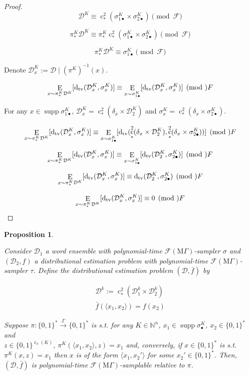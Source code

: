 \documentclass[11pt]{article}
\numberwithin{equation}{section}
\theoremstyle{definition}
\theoremstyle{plain}
\newtheorem{proposition}{Proposition}[section]
\newcommand{\Bool}{\{0,1\}}
\newcommand{\Words}{{\Bool^*}}
\DeclareMathOperator{\Supp}{supp}
\DeclareMathOperator{\E}{E}
\DeclareMathOperator{\R}{r}
\DeclareMathOperator{\En}{c}
\newcommand{\Dtv}{\operatorname{d}_{\textnormal{tv}}}
\newcommand{\Nats}{\mathbb{N}}
\newcommand{\Chev}[1]{\langle #1 \rangle}
\newcommand{\Dist}{\mathcal{D}}
\newcommand{\MGrow}{\mathrm{M}\Gamma}
\newcommand{\Fall}{\mathcal{F}}
\newcommand{\EMG}{\Fall(\MGrow)}
\newcommand{\Scheme}{\xrightarrow{\Gamma}}
\begin{document}
\begin{proof}

\[\Dist^{K} \equiv \En_*^2(\sigma_{1\bullet}^K \times \sigma_{2\bullet}^K)\pmod \Fall\]

\[\pi_*^K\Dist^{K} \equiv \pi_*^K\En_*^2(\sigma_{1\bullet}^K \times \sigma_{2\bullet}^K) \pmod \Fall\] 

\[\pi_*^K\Dist^{K} \equiv  \sigma_{1\bullet}^K \pmod \Fall\]

Denote $\Dist_x^K:=\Dist \mid (\pi^K)^{-1}(x)$.

\[\E_{x \sim \pi_*^K\Dist^{K}}[\Dtv(\Dist_x^K,\sigma_x^K)] \equiv \E_{x \sim \sigma_{1\bullet}^K}[\Dtv(\Dist_x^K,\sigma_x^K)] \pmod \Fall\]

For any $x \in \Supp \sigma_{1\bullet}^{K}$, $\Dist_x^K = \En_*^2(\delta_x \times \Dist_2^{K})$ and $\sigma_x^K=\En_*^2(\delta_x \times \sigma_{2\bullet}^K)$.

\[\E_{x \sim \pi_*^K\Dist^{K}}[\Dtv(\Dist_x^K,\sigma_x^K)] \equiv \E_{x \sim \sigma_{1\bullet}^K}[\Dtv(\En_*^2(\delta_x \times \Dist_2^{K}),\En_*^2(\delta_x \times \sigma_{2\bullet}^K))] \pmod \Fall\]

\[\E_{x \sim \pi_*^K\Dist^{K}}[\Dtv(\Dist_x^K,\sigma_x^K)] \equiv \E_{x \sim \sigma_{1\bullet}^K}[\Dtv(\Dist_2^{K},\sigma_{2\bullet}^K)] \pmod \Fall\]

\[\E_{x \sim \pi_*^K\Dist^{K}}[\Dtv(\Dist_x^K,\sigma_x^K)] \equiv \Dtv(\Dist_2^{K},\sigma_{2\bullet}^K) \pmod \Fall\]

\[\E_{x \sim \pi_*^K\Dist^{K}}[\Dtv(\Dist_x^K,\sigma_x^K)] \equiv 0 \pmod \Fall\]
\end{proof}

\begin{samepage}
\begin{proposition}
\label{prp:thm__mult__cond3}

Consider $\Dist_1$ a word ensemble with polynomial-time $\EMG$-sampler $\sigma$ and $(\Dist_2, f)$ a distributional estimation problem with polynomial-time $\EMG$-sampler $\tau$. Define the distributional estimation problem $(\Dist,\bar{f})$ by 

\begin{align*}
\Dist^k:=\En_*^2(\Dist_1^k \times \Dist_2^k)\\
\bar{f}(\Chev{x_1,x_2})=f(x_2)
\end{align*}

Suppose $\pi: \Words \Scheme \Words$ is s.t. for any $K \in \Nats^n$, ${x_1 \in \Supp \sigma_{\bullet}^{K}}$, ${x_2 \in \Words}$ and\\ $z \in \Bool^{\R_\pi(K)}$, $\pi^{K}(\Chev{x_1,x_2},z)=x_1$ and, conversely, if ${x \in \Words}$ is s.t. ${\pi^K(x,z)=x_1}$ then ${x}$ is of the form ${\Chev{x_1,x_2'}}$ for some ${x_2' \in \Words}$. Then, $(\Dist,\bar{f})$ is polynomial-time $\EMG$-samplable relative to $\pi$.

\end{proposition}
\end{samepage}
\end{document}
